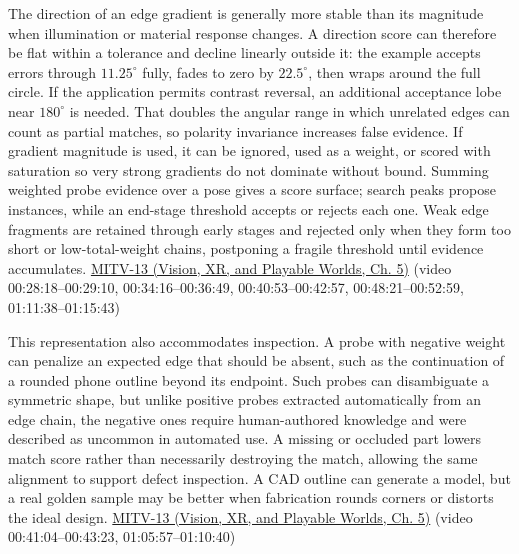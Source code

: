 The direction of an edge gradient is generally more stable than its magnitude when illumination or material response changes. A direction score can therefore be flat within a tolerance and decline linearly outside it: the example accepts errors through \(11.25^\circ\) fully, fades to zero by \(22.5^\circ\), then wraps around the full circle. If the application permits contrast reversal, an additional acceptance lobe near \(180^\circ\) is needed. That doubles the angular range in which unrelated edges can count as partial matches, so polarity invariance increases false evidence. If gradient magnitude is used, it can be ignored, used as a weight, or scored with saturation so very strong gradients do not dominate without bound. Summing weighted probe evidence over a pose gives a score surface; search peaks propose instances, while an end-stage threshold accepts or rejects each one. Weak edge fragments are retained through early stages and rejected only when they form too short or low-total-weight chains, postponing a fragile threshold until evidence accumulates. \href{../07-Vision-XR-and-Playable-Worlds/main.pdf\#nameddest=04-visual-computing-ii-ch036-mitv-13---object-detection-recognition-and-pose-determination-patquick-us-7016539}{MITV-13 (Vision, XR, and Playable Worlds, Ch. 5)} (video 00:28:18--00:29:10, 00:34:16--00:36:49, 00:40:53--00:42:57, 00:48:21--00:52:59, 01:11:38--01:15:43)

This representation also accommodates inspection. A probe with negative weight can penalize an expected edge that should be absent, such as the continuation of a rounded phone outline beyond its endpoint. Such probes can disambiguate a symmetric shape, but unlike positive probes extracted automatically from an edge chain, the negative ones require human-authored knowledge and were described as uncommon in automated use. A missing or occluded part lowers match score rather than necessarily destroying the match, allowing the same alignment to support defect inspection. A CAD outline can generate a model, but a real golden sample may be better when fabrication rounds corners or distorts the ideal design. \href{../07-Vision-XR-and-Playable-Worlds/main.pdf\#nameddest=04-visual-computing-ii-ch036-mitv-13---object-detection-recognition-and-pose-determination-patquick-us-7016539}{MITV-13 (Vision, XR, and Playable Worlds, Ch. 5)} (video 00:41:04--00:43:23, 01:05:57--01:10:40)

